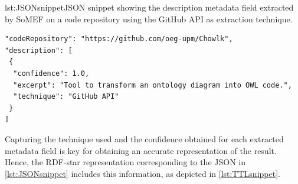 \noindent\hspace{0.07\linewidth}\begin{minipage}{0.9\linewidth}
\begin{captionedlisting}{lst:JSONsnippet}{JSON snippet showing the description metadata field extracted by SoMEF on a code repository using the GitHub API as extraction technique.}
\centering
\hspace{3em}
{
\begin{lstlisting}[basicstyle=\ttfamily\small,label={list:example1},columns=flexible]
"codeRepository": "https://github.com/oeg-upm/Chowlk",
"description": [ 
 {
  "confidence": 1.0,
  "excerpt": "Tool to transform an ontology diagram into OWL code.",
  "technique": "GitHub API"
 }
]  
\end{lstlisting}
}
\end{captionedlisting}
\end{minipage}

Capturing the technique used and the confidence obtained for each extracted metadata field is key for obtaining an accurate representation of the result. Hence, the \mbox{RDF-star} representation corresponding to the JSON in \cref{lst:JSONsnippet} includes this information, as depicted in \cref{lst:TTLsnippet}.



